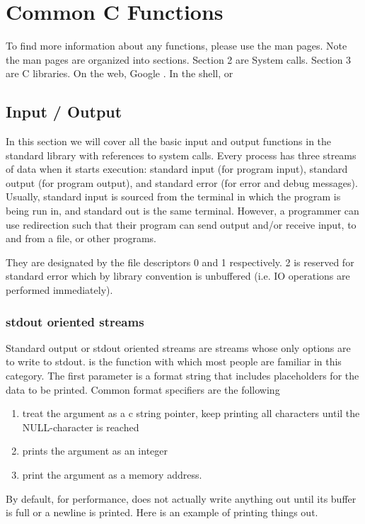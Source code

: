 \section{Common C Functions}

To find more information about any functions, please use the man pages.
Note the man pages are organized into sections.
Section 2 are System calls.
Section 3 are C libraries.
On the web, Google .
In the shell,  or 

\subsection{Input / Output}

In this section we will cover all the basic input and output functions in the standard library with references to system calls.
Every process has three streams of data when it starts execution: standard input (for program input), standard output (for program output), and standard error (for error and debug messages).
Usually, standard input is sourced from the terminal in which the program is being run in, and standard out is the same terminal.
However, a programmer can use redirection such that their program can send output and/or receive input, to and from a file, or other programs.

They are designated by the file descriptors 0 and 1 respectively. 2 is reserved for standard error which by library convention is unbuffered (i.e. IO operations are performed immediately).

\subsubsection{stdout oriented streams}

Standard output or stdout oriented streams are streams whose only options are to write to stdout.
 is the function with which most people are familiar in this category.
The first parameter is a format string that includes placeholders for the data to be printed.
Common format specifiers are the following
\begin{enumerate}
\item {} treat the argument as a c string pointer, keep printing all characters until the NULL-character is reached
\item {} prints the argument as an integer
  \item {} print the argument as a memory address.
    \end{enumerate}
By default, for performance,  does not actually write anything out until its buffer is full or a newline is printed.
Here is an example of printing things out.

